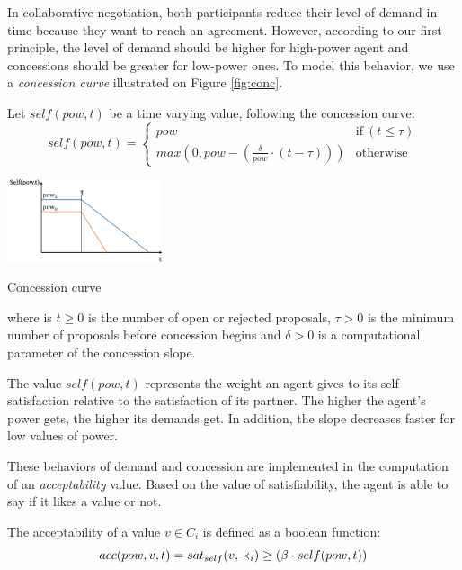 \documentclass{llncs}
\begin{document}
		In collaborative negotiation, both participants reduce their level of demand in time because they want to reach an agreement. However, according to our first principle, the level of demand should be higher for high-power agent and concessions should be greater for low-power ones. To model this behavior, we use a \emph{concession curve} illustrated on Figure \ref{fig:conc}.
		
		Let $self(pow, t)$ be a time varying value, following the concession curve:
		\begin{equation}
		self(pow, t) = \left\{\begin{array}{ll}
		pow & \mathrm{if\ } (t \leq \tau)\\
		max(0, pow - (\frac{\delta}{pow} \cdot (t - \tau))) & \mathrm{otherwise}
		\end{array}\right.
		\end{equation}
			\begin{floatingfigure}[r]{1.8in}
				\includegraphics[width=1.8in]{graphs/sv3.png}
				\caption{\label{fig:conc}Concession curve}
			\end{floatingfigure} 
		where is $t \geq 0$ is the number of open or rejected proposals, $\tau > 0$ is the minimum number of proposals before concession begins and $\delta > 0$ is a computational parameter of the concession slope.
		
		The value $self(pow,t)$ represents the weight an agent gives to its self satisfaction relative to the satisfaction of its partner. The higher the agent's power gets, the higher its demands get. In addition, the slope decreases faster for low values of power.
		 
		These behaviors of demand and concession are implemented in the computation of an \textit{acceptability} value. Based on the value of satisfiability, the agent is able to say if it likes a value or not.
		
		The acceptability of a value $v \in C_i$ is defined as a boolean function:
		\begin{equation}
		\vspace{-.5em} 
		acc(pow,v, t) = sat_{self}(v, \prec_i) \geq  (\beta \cdot self(pow,t))
		\end{equation}
		
\end{document}
